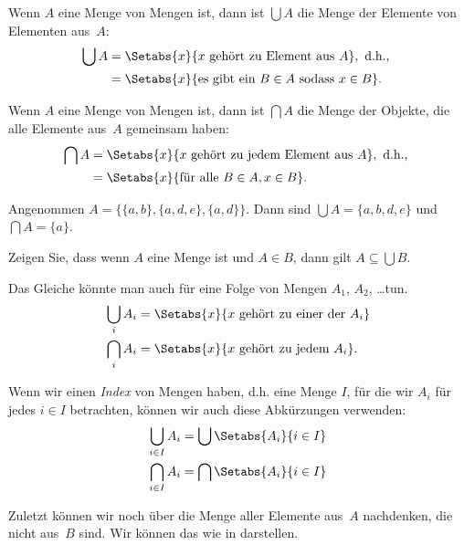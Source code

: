 \documentclass[../../../include/open-logic-section]{subfiles}
\begin{document}
\begin{defn}
Wenn $A$ eine Menge von Mengen ist, dann ist $\bigcup A$ die Menge der Elemente von
Elementen aus~$A$:
\begin{align*}
\bigcup A & = \Setabs{x}{x \text{ gehört zu Element aus } A},
\text{ d.h., }\\
& = \Setabs{x}{\text{es gibt ein } B \in A
  \text{ sodass } x \in B}.
\end{align*}
\end{defn}

\begin{defn}
Wenn $A$ eine Menge von Mengen ist, dann ist $\bigcap A$ die Menge der Objekte, die
alle Elemente aus~$A$ gemeinsam haben:
\begin{align*}
\bigcap A & = \Setabs{x}{x \text{ gehört zu jedem Element aus } A},
\text{ d.h., }\\
 & = \Setabs{x}{\text{für alle } B \in A, x \in B}.
\end{align*}
\end{defn}

\begin{ex}
Angenommen $A = \{ \{ a, b \}, \{ a, d, e \}, \{ a, d \} \}$.
Dann sind $\bigcup A = \{ a, b, d, e \}$ und $\bigcap A = \{ a \}$.
\end{ex}
\begin{prob}
	Zeigen Sie, dass wenn $A$ eine Menge ist und $A \in B$, dann gilt $A \subseteq \bigcup B$.
\end{prob}

Das Gleiche könnte man auch für eine Folge von Mengen $A_1$, $A_2$, \dots tun.
\begin{align*}
\bigcup_i A_i & = \Setabs{x}{x \text{ gehört zu einer der } A_i}\\
\bigcap_i A_i & = \Setabs{x}{x \text{ gehört zu jedem } A_i}.
\end{align*}

Wenn wir einen \emph{Index} von Mengen haben, d.h. eine Menge $I$, für die wir
$A_i$ für jedes $i \in I$ betrachten, können wir auch diese
Abkürzungen verwenden:
\begin{align*}
	\bigcup_{i \in I} A_i & = \bigcup \Setabs{A_i }{i \in I}\\
	\bigcap_{i \in I} A_i & = \bigcap\Setabs{A_i}{i \in I}
\end{align*}

Zuletzt können wir noch über die Menge aller Elemente aus~$A$ nachdenken,
die nicht aus~$B$ sind. Wir können das wie in  darstellen.
\end{document}
